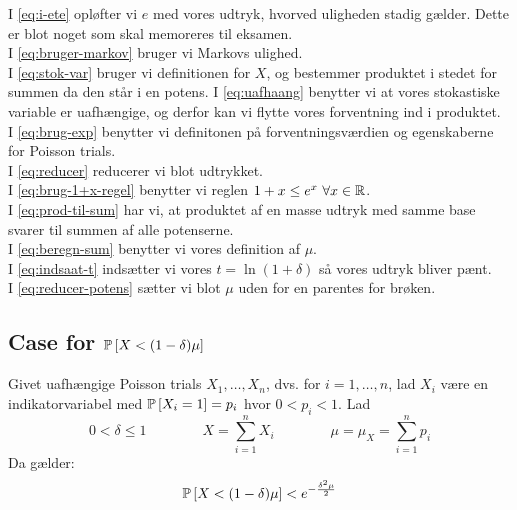 I \cref{eq:i-ete} opløfter vi $e$ med vores udtryk, hvorved uligheden stadig gælder. Dette er blot noget som skal memoreres til eksamen.\\
I \cref{eq:bruger-markov} bruger vi Markovs ulighed.\\
I \cref{eq:stok-var} bruger vi definitionen for $X$, og bestemmer produktet i stedet for summen da den står i en potens.
I \cref{eq:uafhaang} benytter vi at vores stokastiske variable er uafhængige, og derfor kan vi flytte vores forventning ind i produktet.\\
I \cref{eq:brug-exp} benytter vi definitonen på forventningsværdien og egenskaberne for Poisson trials.\\
I \cref{eq:reducer} reducerer vi blot udtrykket.\\
I \cref{eq:brug-1+x-regel} benytter vi reglen $1 + x \leq e^x \ \forall x \in \R$.\\
I \cref{eq:prod-til-sum} har vi, at produktet af en masse udtryk med samme base svarer til summen af alle potenserne.\\
I \cref{eq:beregn-sum} benytter vi vores definition af $\mu$.\\
I \cref{eq:indsaat-t} indsætter vi vores $t = \ln(1 + \delta)$ så vores udtryk bliver pænt.\\
I \cref{eq:reducer-potens} sætter vi blot $\mu$ uden for en parentes for brøken.



\subsection{Case for $\P{X < (1 - \delta) \mu}$}
Givet uafhængige Poisson trials $X_1, \dots, X_n$, dvs. for $i = 1, \dots, n$, lad $X_i$ være en indikatorvariabel med $\P{X_i = 1} = p_i$ hvor $0 < p_i < 1$. Lad
$$
0 < \delta \leq 1
\quad\quad\quad\quad
X = \sum_{i=1}^n X_i
\quad\quad\quad\quad
\mu = \mu_X = \sum_{i=1}^n p_i
$$
Da gælder:
\begin{align}
  \P{X < (1 - \delta) \mu} < e^{- \frac{\delta^2 \mu}{2}} \label{eq:chernoff-2}
\end{align}


